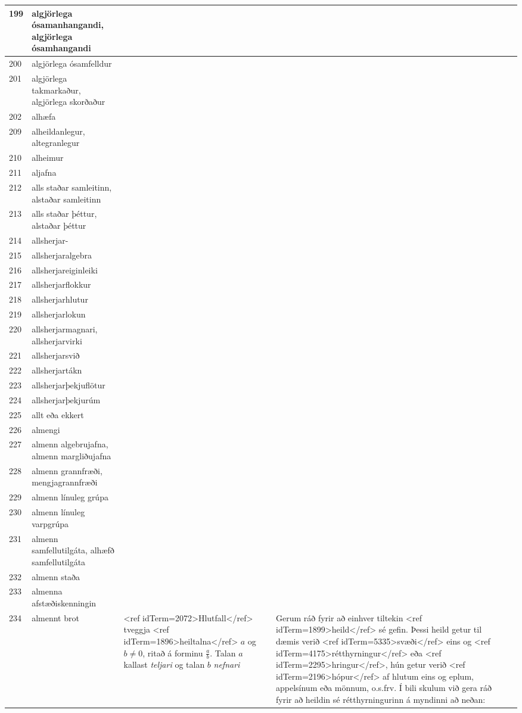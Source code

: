 \begin{longtable}{p{}|p{}|p{}|p{}|p{}}
\hline
199 & algjörlega ósamanhangandi, algjörlega ósamhangandi &  &  &  \\
\hline
200 & algjörlega ósamfelldur &  &  &  \\
\hline
201 & algjörlega takmarkaður, algjörlega skorðaður &  &  &  \\
\hline
202 & alhæfa &  &  &  \\
\hline
209 & alheildanlegur, altegranlegur &  &  &  \\
\hline
210 & alheimur &  &  &  \\
\hline
211 & aljafna &  &  &  \\
\hline
212 & alls staðar samleitinn, alstaðar samleitinn &  &  &  \\
\hline
213 & alls staðar þéttur, alstaðar þéttur &  &  &  \\
\hline
214 & allsherjar- &  &  &  \\
\hline
215 & allsherjaralgebra &  &  &  \\
\hline
216 & allsherjareiginleiki &  &  &  \\
\hline
217 & allsherjarflokkur &  &  &  \\
\hline
218 & allsherjarhlutur &  &  &  \\
\hline
219 & allsherjarlokun &  &  &  \\
\hline
220 & allsherjarmagnari, allsherjarvirki &  &  &  \\
\hline
221 & allsherjarsvið &  &  &  \\
\hline
222 & allsherjartákn &  &  &  \\
\hline
223 & allsherjarþekjuflötur &  &  &  \\
\hline
224 & allsherjarþekjurúm &  &  &  \\
\hline
225 & allt eða ekkert &  &  &  \\
\hline
226 & almengi &  &  &  \\
\hline
227 & almenn algebrujafna, almenn margliðujafna &  &  &  \\
\hline
228 & almenn grannfræði, mengjagrannfræði &  &  &  \\
\hline
229 & almenn línuleg grúpa &  &  &  \\
\hline
230 & almenn línuleg varpgrúpa &  &  &  \\
\hline
231 & almenn samfellutilgáta, alhæfð samfellutilgáta &  &  &  \\
\hline
232 & almenn staða &  &  &  \\
\hline
233 & almenna afstæðiskenningin &  &  &  \\
\hline
234 & almennt brot & <ref idTerm=2072>Hlutfall</ref> tveggja <ref idTerm=1896>heiltalna</ref> $a$ og $b \neq 0$, ritað á forminu $\frac{a}{b}$. Talan $a$ kallast \textit{teljari} og talan $b$ \textit{nefnari} & Gerum ráð fyrir að einhver tiltekin <ref idTerm=1899>heild</ref> sé gefin. Þessi heild getur til dæmis verið <ref idTerm=5335>svæði</ref> eins og <ref idTerm=4175>rétthyrningur</ref> eða <ref idTerm=2295>hringur</ref>, hún getur verið <ref idTerm=2196>hópur</ref> af hlutum eins og eplum, appelsínum eða mönnum, o.s.frv. Í bili skulum við gera ráð fyrir að heildin sé rétthyrningurinn á myndinni að neðan:


\end{longtable}
